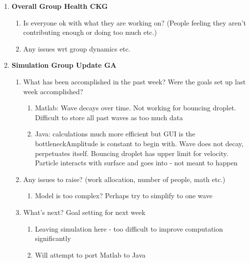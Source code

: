 \begin{enumerate}
\item  \textbf{Overall Group Health CKG}

\begin{enumerate}
\item Is everyone ok with what they are working on? (People feeling they aren't contributing enough or doing too much etc.)

\item  Any issues wrt group dynamics etc.
\vspace{5mm}

\end{enumerate}

\item  \textbf{Simulation Group Update GA}

\begin{enumerate}
\item What has been accomplished in the past week? Were the goals set up last week accomplished?

\begin{enumerate}
\item  Matlab: Wave decays over time. Not working for bouncing droplet. Difficult to store all past waves as too much data

\item  Java: calculations much more efficient but GUI is the bottleneckAmplitude is constant to begin with. Wave does not decay, perpetuates itself. Bouncing droplet has upper limit for velocity. Particle interacts with surface and goes into - not meant to happen
\end{enumerate}

\item  Any issues to raise? (work allocation, number of people,  math etc.)

\begin{enumerate}
\item  Model is too complex? Perhaps try to simplify to one wave
\end{enumerate}

\item  What's next? Goal setting for next week

\begin{enumerate}
\item  Leaving simulation here - too difficult to improve computation significantly

\item  Will attempt to port Matlab to Java


\end{enumerate}
\end{enumerate}
\end{enumerate}
